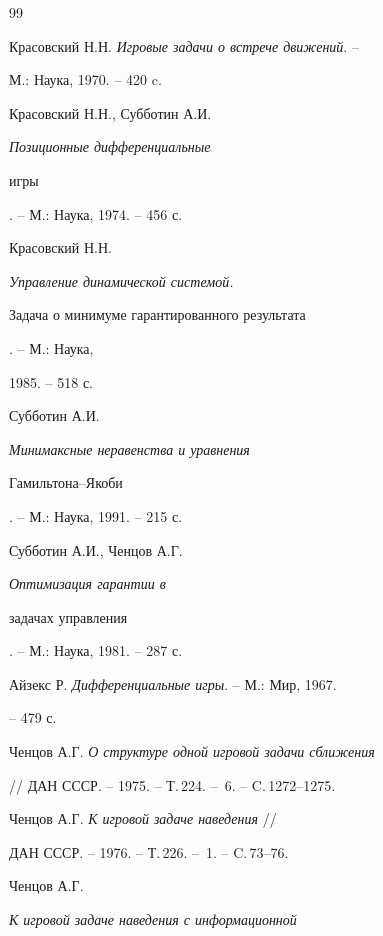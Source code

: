 \begin{thebibliography}{99}





 Красовский Н.Н. {\em Игровые задачи о встрече движений}. --


М.: Наука, 1970. -- 420 c.





 Красовский Н.Н., Субботин А.И. {\em Позиционные дифференциальные


игры}. -- М.: Наука, 1974. -- 456 с.





 Красовский Н.Н. {\em Управление динамической системой.


Задача о минимуме гарантированного результата}. -- М.: Наука,


1985. -- 518 с.





 Субботин А.И. {\em Минимаксные неравенства и уравнения


Гамильтона--Якоби}. -- М.: Наука, 1991. -- 215 с.





 Субботин А.И., Ченцов А.Г. {\em Оптимизация гарантии в


задачах управления}. -- М.: Наука, 1981. -- 287 с.





 Айзекс Р. {\em Дифференциальные игры}. -- М.: Мир, 1967.


-- 479 с.





 Ченцов А.Г. {\em О структуре одной игровой задачи сближения}


// ДАН СССР. -- 1975. -- Т.\,224. -- \No\,6. -- C.\,1272--1275.





 Ченцов А.Г. {\em К игровой задаче наведения} //


ДАН СССР. -- 1976. -- Т.\,226. -- \No\,1. -- C.\,73--76.





 Ченцов А.Г. {\em К игровой задаче наведения с информационной


}
\end{thebibliography}
